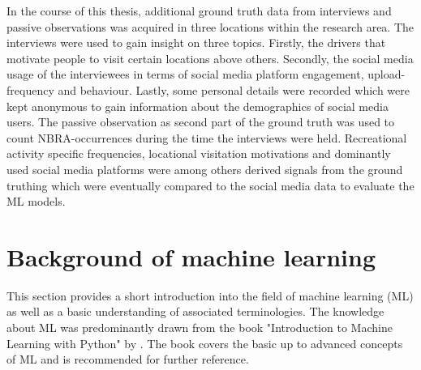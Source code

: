 In the course of this thesis, additional ground truth data from interviews and passive observations was acquired in three locations within the research area. The interviews were used to gain insight on three topics. Firstly, the drivers that motivate people to visit certain locations above others. Secondly, the social media usage of the interviewees in terms of social media platform engagement, upload-frequency and behaviour. Lastly, some personal details were recorded which were kept anonymous to gain information about the demographics of social media users. The passive observation as second part of the ground truth was used to count NBRA-occurrences during the time the interviews were held. Recreational activity specific frequencies, locational visitation motivations and dominantly used social media platforms were among others derived signals from the ground truthing which were eventually compared to the social media data to evaluate the ML models.

\section{Background of machine learning}
This section provides a short introduction into the field of machine learning (ML) as well as a basic understanding of associated terminologies. The knowledge about ML was predominantly drawn from the book "Introduction to Machine Learning with Python" by \textcite{Guido2016}. The book covers the basic up to advanced concepts of ML and is recommended for further reference.\\

